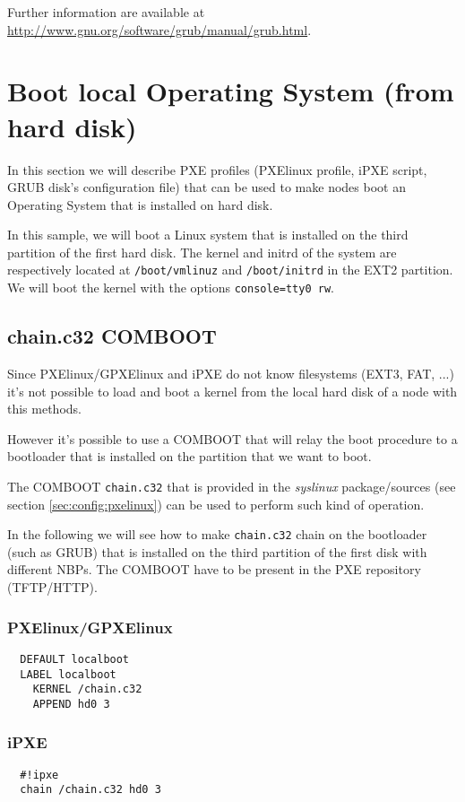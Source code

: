 \documentclass[a4paper,11pt]{article}
\begin{document}
Further information are available at \url{http://www.gnu.org/software/grub/manual/grub.html}.


\section{Boot local Operating System (from hard disk)}
In this section we will describe PXE profiles (PXElinux profile, iPXE script, GRUB disk's configuration file) that can be used to make nodes boot an Operating System that is installed on hard disk.

In this sample, we will boot a Linux system that is installed on the third partition of the first hard disk. The kernel and initrd of the system are respectively located at \texttt{/boot/vmlinuz} and \texttt{/boot/initrd} in the EXT2 partition. We will boot the kernel with the options \texttt{console=tty0 rw}.

\subsection{chain.c32 COMBOOT}
Since PXElinux/GPXElinux and iPXE do not know filesystems (EXT3, FAT, ...) it's not possible to load and boot a kernel from the local hard disk of a node with this methods.

However it's possible to use a COMBOOT that will relay the boot procedure to a bootloader that is installed on the partition that we want to boot.

The COMBOOT \texttt{chain.c32} that is provided in the \emph{syslinux} package/sources (see section \ref{sec:config:pxelinux}) can be used to perform such kind of operation.

In the following we will see how to make \texttt{chain.c32} chain on the bootloader (such as GRUB) that is installed on the third partition of the first disk with different NBPs. The COMBOOT have to be present in the PXE repository (TFTP/HTTP).

\subsubsection{PXElinux/GPXElinux}
\begin{verbatim}
  DEFAULT localboot
  LABEL localboot
    KERNEL /chain.c32
    APPEND hd0 3
\end{verbatim}

\subsubsection{iPXE}
\begin{verbatim}
  #!ipxe
  chain /chain.c32 hd0 3
\end{verbatim}
\hrulefill
\end{document}
